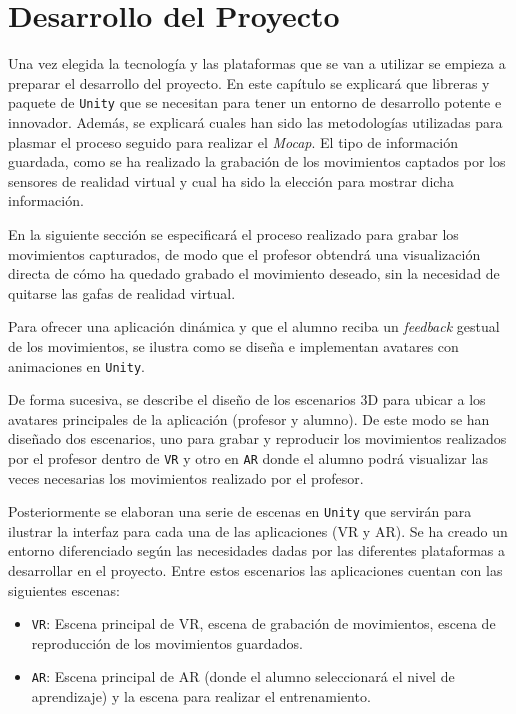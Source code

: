 %
%
\chapter{Desarrollo del Proyecto}

\label{cap5:sec:Desarrollo del Proyecto}

Una vez elegida la tecnología y las plataformas que se van a utilizar se empieza a preparar el desarrollo del proyecto. En este capítulo se explicará que libreras y paquete de \texttt{Unity} que se necesitan para tener un entorno de desarrollo potente e innovador. Además, se explicará cuales han sido las metodologías utilizadas para plasmar el proceso seguido para realizar el \textit{Mocap}. El tipo de información guardada, como se ha realizado la grabación de los movimientos captados por los sensores de realidad virtual y cual ha sido la elección para mostrar dicha información.

En la siguiente sección se especificará el proceso realizado para grabar los movimientos capturados, de modo que el profesor obtendrá una visualización directa de cómo ha quedado grabado el movimiento deseado, sin la necesidad de quitarse las gafas de realidad virtual.

Para ofrecer una aplicación dinámica y que el alumno reciba un \textit{feedback} gestual de los movimientos, se ilustra como se diseña e implementan avatares con animaciones en \texttt{Unity}.

De forma sucesiva, se describe el diseño de los escenarios 3D para ubicar a los avatares principales de la aplicación (profesor y alumno). De este modo se han diseñado dos escenarios, uno para grabar y reproducir los movimientos realizados por el profesor dentro de \texttt{VR} y otro en \texttt{AR} donde el alumno podrá visualizar las veces necesarias los movimientos realizado por el profesor.

Posteriormente se elaboran una serie de escenas en \texttt{Unity} que servirán para ilustrar la interfaz para cada una de las aplicaciones (VR y AR). Se ha creado un entorno diferenciado según las necesidades dadas por las diferentes plataformas a desarrollar en el proyecto. Entre estos escenarios las aplicaciones cuentan con las siguientes escenas:

\begin{itemize}
	\item \texttt{VR}: Escena principal de VR, escena de grabación de movimientos, escena de reproducción de los movimientos guardados.
 	\item \texttt{AR}: Escena principal de AR (donde el alumno seleccionará el nivel de aprendizaje) y la escena para realizar el entrenamiento.
\end{itemize}

